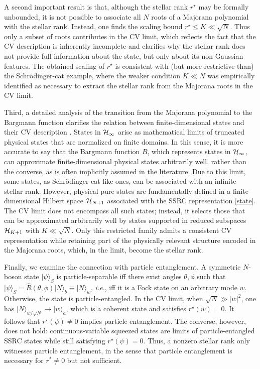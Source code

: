 \documentclass[aps,prl,showpacs,twocolumn]{revtex4-2}
\providecommand{\ket}[1]{\lvert #1 \rangle}
\providecommand{\ket}[1]{\lvert #1 \rangle}
\providecommand{\ket}[1]{\lvert #1 \rangle}
\providecommand{\ket}[1]{\lvert #1 \rangle}
\begin{document}
A second important result is that, although the stellar rank $r^{\star}$ may be formally unbounded, it is not possible to associate all $N$ roots of a Majorana polynomial with the stellar rank. Instead, one finds the scaling bound $r^{\star} \le K \ll \sqrt{N}$. Thus only a subset of roots contributes in the CV limit, which reflects the fact that the CV description is inherently incomplete and clarifies why the stellar rank does not provide full information about the state, but only about its non-Gaussian features. The obtained scaling of $r^{\star}$ is consistent with (but more restrictive than) the Schrödinger-cat example, where the weaker condition $K \ll N$ was empirically identified as necessary to extract the stellar rank from the Majorana roots in the CV limit.

Third, a detailed analysis of the transition from the Majorana polynomial to the Bargmann function clarifies the relation between finite-dimensional states and their CV description \cite{Arzani2025BosonicComplete,upreti2025, Marshall:23, orlov2025, maltesson2025}. States in ${\cal H}_{\infty}$ arise as mathematical limits of truncated physical states that are normalized on finite domains. In this sense, it is more accurate to say that the Bargmann function $B$, which represents states in ${\cal H}_{\infty}$, can approximate finite-dimensional physical states arbitrarily well, rather than the converse, as is often implicitly assumed in the literature. Due to this limit, some states, as Schrödinger cat-like ones, can be associated with an infinite stellar rank. However, physical pure states are fundamentally defined in a finite-dimensional Hilbert space ${\cal H}_{N+1}$ associated with the SSRC representation \eqref{state}. The CV limit does not encompass all such states; instead, it selects those that can be approximated arbitrarily well by states supported in reduced subspaces ${\cal H}_{K+1}$ with $K \ll \sqrt{N}$. Only this restricted family admits a consistent CV representation while retaining part of the physically relevant structure encoded in the Majorana roots, which, in the limit, become the stellar rank.




Finally, we examine the connection with particle entanglement. A symmetric $N$-boson state $\ket{\psi}_S$ is particle-separable iff there exist angles $\theta,\phi$ such that
$\ket{\psi}_S=\hat R(\theta,\phi)\ket{N}_b \equiv \ket{N}_w$, {\it i.e.}, iff it is a Fock state on an arbitrary mode $w$. Otherwise, the state is particle-entangled. In the CV limit, when $\sqrt{N}\gg |w|^2$, one has $\ket{N}_{w/\sqrt{N}} \to \ket{w}_a$, which is a coherent state and satisfies $r^{\star}(w)=0$. It follows that
$r^{\star}(\psi)\neq 0$  implies particle entanglement. The converse, however, does not hold: continuous-variable squeezed states are limits of particle-entangled SSRC states \cite{descamps2025unifiedframeworkbosonicquantum} while still satisfying $r^{\star}(\psi)=0$. Thus, a nonzero stellar rank only witnesses particle entanglement, in the sense that particle entanglement is necessary for $r^{*}\neq 0$ but not sufficient.
\end{document}

